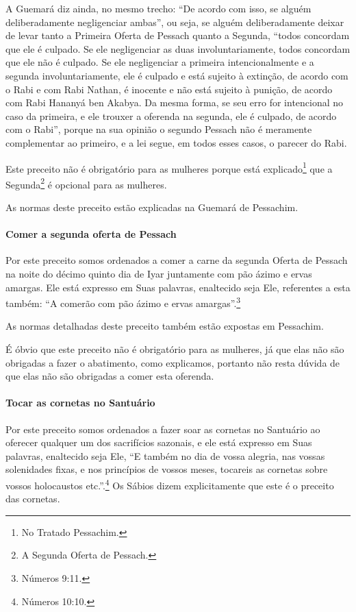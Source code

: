 A Guemará diz ainda, no mesmo trecho: ``De acordo com isso, se alguém
deliberadamente negligenciar ambas'', ou seja, se alguém deliberadamente
deixar de levar tanto a Primeira Oferta de Pessach quanto a Segunda,
``todos concordam que ele é culpado. Se ele negligenciar as duas
involuntariamente, todos concordam que ele não é culpado. Se ele
negligenciar a primeira intencionalmente e a segunda involuntariamente,
ele é culpado e está sujeito à extinção, de acordo com o Rabi e com Rabi
Nathan, é inocente e não está sujeito à punição, de acordo com Rabi
Hananyá ben Akabya. Da mesma forma, se seu erro for intencional no caso
da primeira, e ele trouxer a oferenda na segunda, ele é culpado, de
acordo com o Rabi'', porque na sua opinião o segundo Pessach não é
meramente complementar ao primeiro, e a lei segue, em todos esses casos,
o parecer do Rabi.

Este preceito não é obrigatório para as mulheres porque está explicado\footnote{No Tratado Pessachim.} que a Segunda\footnote{A Segunda Oferta de Pessach.} é opcional para as mulheres.

As normas deste preceito estão explicadas na Guemará de Pessachim.

\paragraph{Comer a segunda oferta de Pessach}

Por este preceito somos ordenados a comer a carne da segunda Oferta de
Pessach na noite do décimo quinto dia de Iyar juntamente com pão
ázimo e ervas amargas. Ele está expresso em Suas palavras, enaltecido
seja Ele, referentes a esta também: ``A comerão com pão ázimo e ervas
amargas''.\footnote{Números 9:11.}

As normas detalhadas deste preceito também estão expostas em Pessachim.

É óbvio que este preceito não é obrigatório para as mulheres, já que
elas não são obrigadas a fazer o abatimento, como explicamos, portanto
não resta dúvida de que elas não são obrigadas a comer esta oferenda.

\paragraph{Tocar as cornetas no Santuário}

Por este preceito somos ordenados a fazer soar as cornetas no Santuário
ao oferecer qualquer um dos sacrifícios sazonais, e ele está expresso em
Suas palavras, enaltecido seja Ele, ``E também no dia de vossa alegria,
nas vossas solenidades fixas, e nos princípios de vossos meses,
tocareis as cornetas sobre vossos holocaustos etc.''.\footnote{Números 10:10.}
Os Sábios dizem explicitamente que este é o preceito das cornetas.

